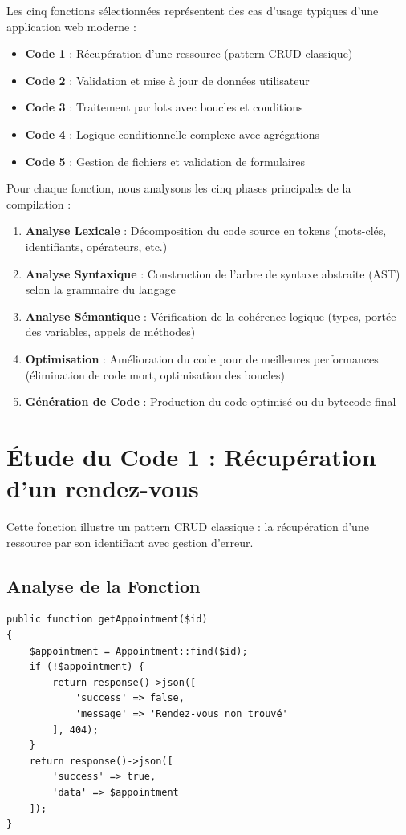 \documentclass[12pt,a4paper]{report}
\begin{document}
Les cinq fonctions sélectionnées représentent des cas d'usage typiques d'une application web moderne :
\begin{itemize}
    \item \textbf{Code 1} : Récupération d'une ressource (pattern CRUD classique)
    \item \textbf{Code 2} : Validation et mise à jour de données utilisateur
    \item \textbf{Code 3} : Traitement par lots avec boucles et conditions
    \item \textbf{Code 4} : Logique conditionnelle complexe avec agrégations
    \item \textbf{Code 5} : Gestion de fichiers et validation de formulaires
\end{itemize}

Pour chaque fonction, nous analysons les cinq phases principales de la compilation :
\begin{enumerate}
    \item \textbf{Analyse Lexicale} : Décomposition du code source en tokens (mots-clés, identifiants, opérateurs, etc.)
    \item \textbf{Analyse Syntaxique} : Construction de l'arbre de syntaxe abstraite (AST) selon la grammaire du langage
    \item \textbf{Analyse Sémantique} : Vérification de la cohérence logique (types, portée des variables, appels de méthodes)
    \item \textbf{Optimisation} : Amélioration du code pour de meilleures performances (élimination de code mort, optimisation des boucles)
    \item \textbf{Génération de Code} : Production du code optimisé ou du bytecode final
\end{enumerate}

\section{Étude du Code 1 : Récupération d'un rendez-vous}

Cette fonction illustre un pattern CRUD classique : la récupération d'une ressource par son identifiant avec gestion d'erreur.

\subsection{Analyse de la Fonction}

\begin{lstlisting}[style=phpstyle, caption=Fonction getAppointment]
public function getAppointment($id)
{
    $appointment = Appointment::find($id);
    if (!$appointment) {
        return response()->json([
            'success' => false,
            'message' => 'Rendez-vous non trouvé'
        ], 404);
    }
    return response()->json([
        'success' => true,
        'data' => $appointment
    ]);
}
\end{lstlisting}
\end{document}
